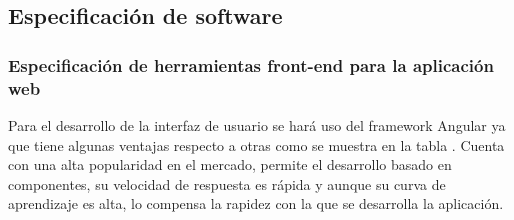 
\subsection{Especificación de software}



\subsubsection{Especificación de herramientas front-end para la aplicación web}

Para el desarrollo de la interfaz de usuario se hará uso del framework Angular ya que tiene algunas ventajas respecto a otras como se muestra en la tabla \TODO. Cuenta con una alta popularidad en el mercado, permite el desarrollo basado en componentes, su velocidad de respuesta es rápida y aunque su curva de aprendizaje es alta, lo compensa la rapidez con la que se desarrolla la aplicación.